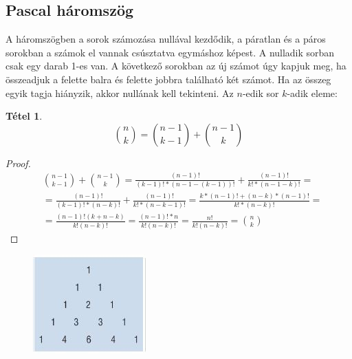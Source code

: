 \documentclass[twoside,12pt]{report}
\newtheorem{theorem}{Tétel}[section]
\theoremstyle{definition}
\begin{document}
	\subsection{Pascal háromszög}
	A háromszögben a sorok számozása nullával kezdődik, a páratlan és a páros sorokban a számok el
	vannak csúsztatva egymáshoz képest. A nulladik sorban csak egy darab 1-es van. A következő sorokban az új számot úgy kapjuk meg, ha összeadjuk a felette balra és felette jobbra található két számot. Ha az összeg egyik tagja hiányzik, akkor nullának kell tekinteni. Az $n$-edik sor $k$-adik eleme:
	\begin{theorem}
		\begin{equation*}
			\binom{n}{k}=\binom{n-1}{k-1}+\binom{n-1}{k}
		\end{equation*}
	\end{theorem}
	\begin{proof}
		\begin{align*}
			&\binom{n-1}{k-1}+\binom{n-1}{k}=\frac{(n-1)!}{(k-1)!*(n-1-(k-1))!}+
			\frac{(n-1)!}{k!*(n-1-k)!}=\\
			&=\frac{(n-1)!}{(k-1)!*(n-k)!}+\frac{(n-1)!}{k!*(n-k-1)!}=
			\frac{k*(n-1)!+(n-k)*(n-1)!}{k!*(n-k)!}=\\
			&=\frac{(n-1)!(k+n-k)}{k!(n-k)!}=\frac{(n-1)!*n}{k!(n-k)!}=\frac{n!}{k!(n-k)!}=\binom{n}{k}
		\end{align*}
	\end{proof}
	\begin{figure}[H]
		\centering
		\includegraphics[width=.3\linewidth]{Pascal}
	\end{figure}
\end{document}
